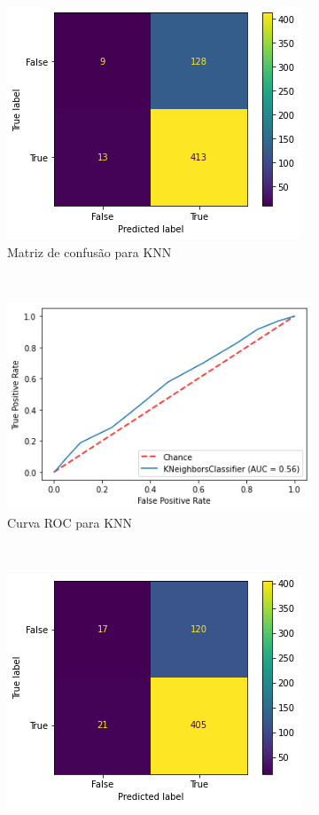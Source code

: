 \begin{figure}[htb] 
    \centering 
    \caption{Resultado das tentativas de classificação para cada método aplicado sobre dados de CNAEs para impacto mensal}
    \label{fig:resultados:classification-monthly-cnae} 
    \begin{subfigure}[b]{0.45\textwidth}
        \includegraphics[scale=0.55]{images/base-de-dados-28.3.5-confusion-matrix-knn-monthly-cnae.png}
        \caption{Matriz de confusão para KNN}
        \label{fig:resultados:base-de-dados-28.3.5-confusion-matrix-knn-monthly-cnae}
    \end{subfigure} ~ \quad
    \begin{subfigure}[b]{0.45\textwidth}
        \includegraphics[scale=0.55]{images/base-de-dados-28.3.6-roc-curve-knn-monthly-cnae.png}
        \caption{Curva ROC para KNN}
        \label{fig:resultados:base-de-dados-28.3.6-roc-curve-knn-monthly-cnae}
    \end{subfigure} ~ \\
    \begin{subfigure}[b]{0.45\textwidth}
        \includegraphics[scale=0.55]{images/base-de-dados-28.3.1-confusion-matrix-randomforest-monthly-cnae.png}

\end{subfigure}
\end{figure}
